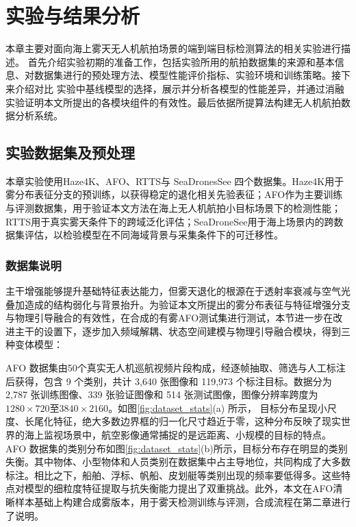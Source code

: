 
\renewcommand{\topfraction}{0.9}        %
\renewcommand{\bottomfraction}{0.9}     %
\renewcommand{\textfraction}{0.1}       %
\renewcommand{\floatpagefraction}{0.85} %


\chapter{实验与结果分析}
\label{chap:experiments}

本章主要对面向海上雾天无人机航拍场景的端到端目标检测算法的相关实验进行描述。
首先介绍实验初期的准备工作，包括实验所用的航拍数据集的来源和基本信息、对数据集进行的预处理方法、模型性能评价指标、实验环境和训练策略。接下来介绍对比
实验中基线模型的选择，展示并分析各模型的性能差异，并通过消融实验证明本文所提出的各模块组件的有效性。最后依据所提算法构建无人机航拍数据分析系统。

\section{实验数据集及预处理}
\label{sec:dataset_preprocess}

本章实验使用Haze4K、AFO、RTTS与 SeaDronesSee 四个数据集。Haze4K用于雾分布表征分支的预训练，以获得稳定的退化相关先验表征；AFO作为主要训练与评测数据集，用于验证本文方法在海上无人机航拍小目标场景下的检测性能；RTTS用于真实雾天条件下的跨域泛化评估；SeaDroneSee用于海上场景内的跨数据集评估，以检验模型在不同海域背景与采集条件下的可迁移性。

\subsection{数据集说明}
\label{subsec:datasets}

主干增强能够提升基础特征表达能力，但雾天退化的根源在于透射率衰减与空气光叠加造成的结构弱化与背景抬升。为验证本文所提出的雾分布表征与特征增强分支与物理引导融合的有效性，在合成的有雾AFO测试集进行测试，本节进一步在改进主干的设置下，逐步加入频域解耦、状态空间建模与物理引导融合模块，得到三种变体模型：

AFO 数据集由50个真实无人机巡航视频片段构成，经逐帧抽取、筛选与人工标注后获得，包含 9 个类别，共计 3,640 张图像和 119,973 个标注目标。数据分为 2,787 张训练图像、339 张验证图像和 514 张测试图像，图像分辨率跨度为$1280\times720$至$3840\times2160$。如图\ref{fig:dataset_stats}(a) 所示，
目标分布呈现小尺度、长尾化特征，绝大多数边界框的归一化尺寸趋近于零，这种分布反映了现实世界的海上监视场景中，航空影像通常捕捉的是远距离、小规模的目标的特点。AFO 数据集的类别分布如图\ref{fig:dataset_stats}(b)所示，目标分布存在明显的类别失衡。其中物体、小型物体和人员类别在数据集中占主导地位，共同构成了大多数标注。相比之下，船舶、浮标、帆船、皮划艇等类别出现的频率要低得多。这些特点对模型的细粒度特征提取与抗失衡能力提出了双重挑战。此外，本文在AFO清晰样本基础上构建合成雾版本，用于雾天检测训练与评测，合成流程在第二章进行了说明。

